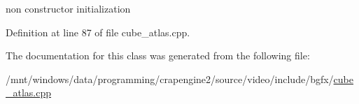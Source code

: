 non constructor initialization 



Definition at line 87 of file cube\+\_\+atlas.\+cpp.



The documentation for this class was generated from the following file\+:\begin{DoxyCompactItemize}
\item 
/mnt/windows/data/programming/crapengine2/source/video/include/bgfx/\hyperlink{cube__atlas_8cpp}{cube\+\_\+atlas.\+cpp}\end{DoxyCompactItemize}
